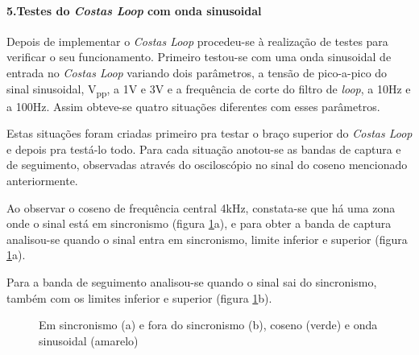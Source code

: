 \documentclass[11pt]{article}
\numberwithin{equation}{section}
\begin{document}
\paragraph{5.Testes do \textit{Costas Loop} com onda sinusoidal} \hspace{0pt} \label{para:P3-5}

Depois de implementar o \textit{Costas Loop} procedeu-se à realização de testes para verificar o seu funcionamento. Primeiro testou-se com uma onda sinusoidal de entrada no \textit{Costas Loop} variando dois parâmetros, a  tensão de pico-a-pico do sinal sinusoidal, V\textsubscript{pp}, a 1V e 3V e a frequência de corte do filtro de \textit{loop}, a 10Hz e a 100Hz. Assim obteve-se quatro situações diferentes com esses parâmetros.

 Estas situações foram criadas primeiro pra testar o braço superior do \textit{Costas Loop} e depois pra testá-lo todo. Para cada situação anotou-se as bandas de captura e de seguimento, observadas através do osciloscópio no sinal do coseno mencionado anteriormente. 
 
 Ao observar o coseno de frequência central 4kHz, constata-se que há uma zona onde o sinal está em sincronismo (figura \ref{cap_segue}a), e para obter a banda de captura analisou-se quando o sinal entra em sincronismo, limite inferior e superior (figura \ref{cap_segue}a).
 
Para a banda de seguimento analisou-se quando o sinal sai do sincronismo, também com os limites inferior e superior (figura \ref{cap_segue}b).
\begin{figure}[h]
	\centering
	\hspace{6 mm}
	\caption{Em sincronismo (a) e fora do sincronismo (b), coseno (verde) e onda sinusoidal (amarelo)}
	\label{cap_segue}
\end{figure}
\end{document}
